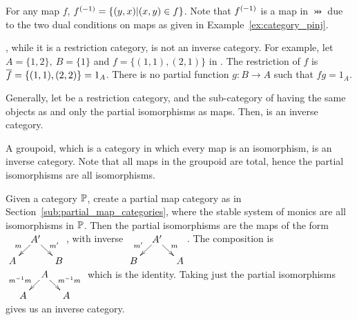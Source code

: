 \begin{example}\label{ex:pinj_is_an_inverse_category}
  For any map $f$, ${f}^{(-1)} = \{(y,x) | (x,y) \in
  f\}$. Note that ${f}^{(-1)}$ is a map in $\pinj$ due to the two dual conditions on maps as given in
  Example~\ref{ex:category_pinj}.
\end{example}
\begin{example}\label{ex:par_is_not_an_inverse_category}
  \Par, while it is a restriction category, is not an inverse category. For example, let
  $A=\{1,2\},\ B=\{1\}$ and $f=\{(1,1),(2,1)\}$ in \Par. The restriction of $f$ is $\overline{f} =
  \{(1,1),(2,2)\} = 1_A$. There is no partial function $g:B\to A$ such that $f g = 1_A$.
\end{example}
\begin{example}\label{ex:partial_isos_are_inverse_category}
  Generally, let \R be a restriction category, and \X the sub-category of \R having the same objects
  as \R and only the partial isomorphisms as maps. Then, \X is an inverse category.
\end{example}
\begin{example}\label{ex:groupoid_is_inverse_category}
  A groupoid, which is a category in which every map is an isomorphism, is an inverse category. Note
  that all maps in the groupoid are total, hence the partial isomorphisms are all isomorphisms.
\end{example}
\begin{example}\label{ex:partial_map_monics_is_inverse_category}
  Given a category $\mathbb{P}$, create a partial map category as in
  Section~\ref{sub:partial_map_categories}, where the stable system of monics are all isomorphisms
  in $\mathbb{P}$. Then the partial isomorphisms are the maps of the form
  $\xymatrix @R-15pt @C-15pt{&A'\ar[dl]_{m} \ar[dr]^{m'}\\A&&B}$, with inverse
  $\xymatrix @R-15pt @C-15pt{&A'\ar[dl]_{m'} \ar[dr]^{m}\\B&&A}$. The composition is
  $\xymatrix @R-15pt @C-15pt{&A\ar[dl]_{m^{-1}m} \ar[dr]^{m^{-1}m}\\A&&A}$ which is the
  identity. Taking just the partial isomorphisms gives us an inverse category.
\end{example}

